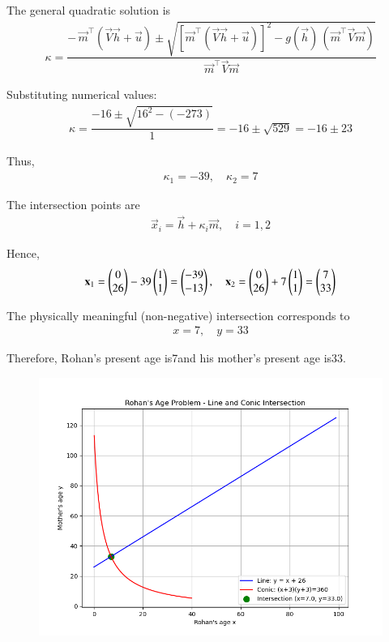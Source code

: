 \documentclass[journal]{IEEEtran}
\begin{document}
The general quadratic solution is
\begin{align}
\kappa =
\dfrac{
-\,\vec{m}^\top (\vec{V}\vec{h} + \vec{u})
\pm
\sqrt{
\left[\vec{m}^\top (\vec{V}\vec{h} + \vec{u})\right]^2
- g(\vec{h})\,(\vec{m}^\top \vec{V}\vec{m})
}
}{
\vec{m}^\top \vec{V}\vec{m}
}
\end{align}

Substituting numerical values:
\begin{align}
\kappa =
\dfrac{-16 \pm \sqrt{16^2 - (-273)}}{1}
= -16 \pm \sqrt{529}
= -16 \pm 23
\end{align}

Thus,
\begin{align}
\kappa_1 = -39, \quad \kappa_2 = 7
\end{align}

The intersection points are
\begin{align}
\vec{x}_i = \vec{h} + \kappa_i \vec{m}, \quad i = 1,2
\end{align}

Hence,
\begin{align}
\mathbf{x}_1 = \begin{pmatrix}0 \\ 26\end{pmatrix} - 39\begin{pmatrix}1 \\ 1\end{pmatrix} = \begin{pmatrix}-39 \\ -13\end{pmatrix}, \quad
\mathbf{x}_2 = \begin{pmatrix}0 \\ 26\end{pmatrix} + 7\begin{pmatrix}1 \\ 1\end{pmatrix} = \begin{pmatrix}7 \\ 33\end{pmatrix}
\end{align}

The physically meaningful (non-negative) intersection corresponds to
\begin{align}
\boxed{x = 7, \quad y = 33}
\end{align}

Therefore, Rohan's present age is{7}and his mother's present age is{33}.

\begin{figure}[H]
    \centering
    \includegraphics[width=0.8\columnwidth]{Figs/Fig1.png}
    \caption{}
    \label{fig:placeholder}
\end{figure}
\end{document}
